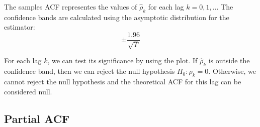 The samples ACF representes the values of $\hat{\rho}_k$ for each lag $k=0,1,\dots$
The confidence bands are calculated using the asymptotic distribution for the estimator:
\begin{equation*}
    \pm \frac{1.96}{\sqrt{T}}
\end{equation*}

For each lag $k$, we can test its significance by using the plot. If
$\hat{\rho}_k$ is outside the confidence band, then we can reject the null
hypothesis $H_0:\rho_k=0$. Otherwise, we cannot reject the null hypothesis
and the theoretical ACF for this lag can be considered null.

\subsection{Partial ACF}

